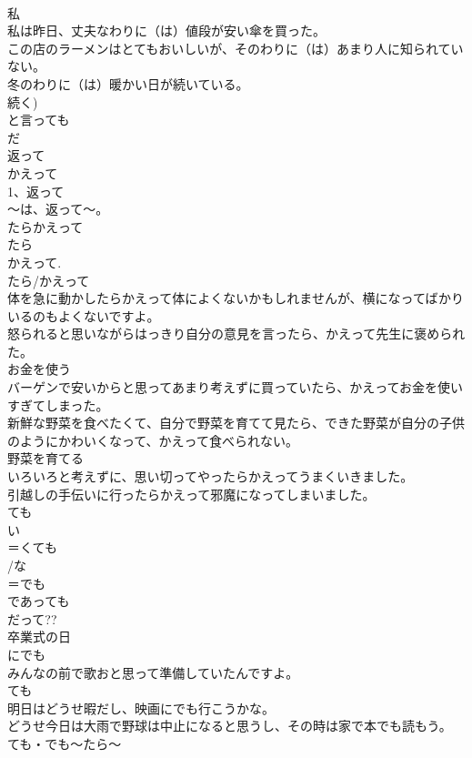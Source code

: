 \documentclass[8pt]{extreport}
\begin{document}
\begin{CJK}{UTF8}{min}
\\	私 
\\	私は昨日、丈夫なわりに（は）値段が安い傘を買った。
\\	この店のラーメンはとてもおいしいが、そのわりに（は）あまり人に知られていない。
\\	冬のわりに（は）暖かい日が続いている。
\\	続く)
\\	と言っても
\\	だ 
\\	返って
\\	かえって
\\	1、返って
\\	～は、返って～。
\\	たらかえって
\\	たら 
\\	かえって.
\\	たら/かえって 
\\	体を急に動かしたらかえって体によくないかもしれませんが、横になってばかりいるのもよくないですよ。
\\	怒られると思いながらはっきり自分の意見を言ったら、かえって先生に褒められた。
\\	お金を使う　　
\\	バーゲンで安いからと思ってあまり考えずに買っていたら、かえってお金を使いすぎてしまった。
\\	新鮮な野菜を食べたくて、自分で野菜を育てて見たら、できた野菜が自分の子供のようにかわいくなって、かえって食べられない。
\\	野菜を育てる
\\	いろいろと考えずに、思い切ってやったらかえってうまくいきました。
\\	引越しの手伝いに行ったらかえって邪魔になってしまいました。
\\	ても
\\	い
\\	＝くても
\\	/な
\\	＝でも 
\\	であっても
\\	だって?? 
\\	卒業式の日
\\	にでも
\\	みんなの前で歌おと思って準備していたんですよ。
\\	ても 
\\	明日はどうせ暇だし、映画にでも行こうかな。
\\	どうせ今日は大雨で野球は中止になると思うし、その時は家で本でも読もう。
\\	ても・でも～たら～

\end{CJK}
\end{document}
